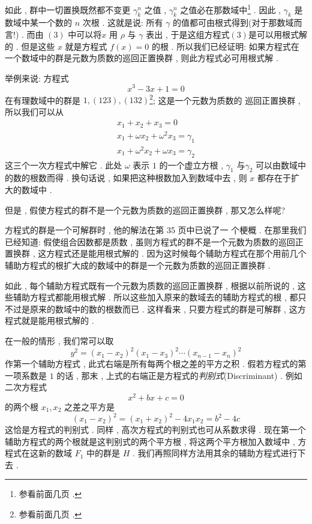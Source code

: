 如此 , 群中一切置换既然都不变更 $\gamma_{k}^{n}$ 之值 ,  $\gamma_{k}^{n}$ 之值必在那数域中\footnote{参看前面几页 . } . 因此 ,  $\gamma_{k}$ 是数域中某一个数的 $n$ 次根 . 这就是说: 所有 $\gamma$ 的值都可由根式得到(对于那数域而言!) . 而由 $(3)$ 中可以将$x$ 用 $\rho$ 与 $\gamma$ 表出 , 于是这组方程式$(3)$是可以用根式解的 . 但是这些 $x$ 就是方程式 $f(x)=0$ 的根 . 所以我们已经证明: 如果方程式在一个数域中的群是元数为质数的巡回正置换群 , 则此方程式必可用根式解 . 

举例来说: 方程式
\[
x^{3}-3 x+1=0
\]
在有理数域中的群是 $1 ,  (123) ,  (132)$\footnote{参看前面几页 . }; 这是一个元数为质数的 巡回正置换群 , 所以我们可以从
\[
\begin{array}{c}
	x_{1}+x_{2}+x_{3}=0 \\
	x_{1}+\omega x_{2}+\omega^{2} x_{3}=\gamma_{1} \\
	x_{1}+\omega^{2} x_{2}+\omega x_{3}=\gamma_{2}
\end{array}
\]
这三个一次方程式中解它 . 此处 $\omega$ 表示 $1$ 的一个虚立方根 , $\gamma_{1}$ 与$\gamma_{2}$ 可以由数域中的数的根数而得 . 换句话说 , 如果把这种根数加入到数域中去 , 则 $x$ 都存在于扩大的数域中 . 

但是 , 假使方程式的群不是一个元数为质数的巡回正置换群 , 那又怎么样呢?

方程式的群是一个可解群时 , 他的解法在第 35 页中已说了一 个梗概 . 在那里我们已经知道: 假使组合因数都是质数 , 虽则方程式的群不是一个元数为质数的巡回正置换群 , 这方程式还是能用根式解的 . 因为这时候每个辅助方程式在那个用前几个辅助方程式的根扩大成的数域中的群是一个元数为质数的巡回正置换群 . 

如此 , 每个辅助方程式既有一个元数为质数的巡回正置换群 ,  根据以前所说的 , 这些辅助方程式都能用根式解 . 所以这些加入原来的数域去的辅助方程式的根 , 都只不过是原来的数域中的数的根数而已 . 这样看来 , 只要方程式的群是可解群 , 这方程式就是能用根式解的 . 

在一般的情形 , 我们常可以取
\[
y^{2}=\left(x_{1}-x_{2}\right)^{2}\left(x_{1}-x_{3}\right)^{2}  \cdots \left(x_{n-1}-x_{n}\right)^{2}
\]
作第一个辅助方程式 , 此式右端是所有每两个根之差的平方之积 . 假若方程式的第一项系数是 $1$ 的话 , 那末 , 上式的右端正是方程式的\emph{判别式}(Discriminant) . 例如二次方程式
\[
x^{2}+b x+c=0
\]
的两个根 $x_{1} ,  x_{2}$ 之差之平方是
\[
\left(x_{1}-x_{2}\right)^{2}=\left(x_{1}+x_{2}\right)^{2}-4 x_{1} x_{2}=b^{2}-4 c
\]
这恰是方程式的判别式 . 同样 , 高次方程式的判别式也可从系数求得 . 现在第一个辅助方程式的两个根就是这判别式的两个平方根 , 将这两个平方根加入数域中 , 方程式在这新的数域 $F_{1}$ 中的群是 $H$ .  我们再照同样方法用其余的辅助方程式进行下去 . 

